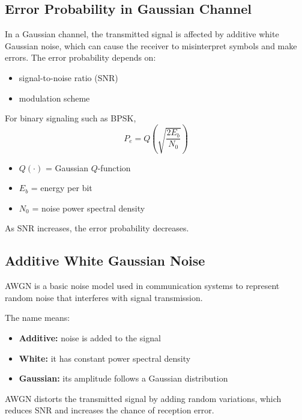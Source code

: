 \documentclass[11pt,a4paper]{book}
\newenvironment{definitionbox}[1][Definition]{%
    \begin{tcolorbox}[
        enhanced,
        breakable,
        colback=primaryblue!10,
        colframe=primaryblue!150,
        title=#1,
        fonttitle=\bfseries,
        sharp corners,
        boxrule=0.8pt,
        left=8pt,
        right=8pt,
        top=6pt,
        bottom=6pt
    ]
}{\end{tcolorbox}}
\newenvironment{formulabox}[1][Formula]{%
    \begin{tcolorbox}[
        enhanced,
        breakable,
        colback=softcoral!10,
        colframe=softcoral!200,
        title=#1,
        fonttitle=\bfseries,
        coltitle=white,
        sharp corners,
        boxrule=1pt,
        left=8pt,
        right=8pt,
        top=6pt,
        bottom=6pt
    ]
}{\end{tcolorbox}}
\begin{document}
\subsection{Error Probability in Gaussian Channel}

In a Gaussian channel, the transmitted signal is affected by additive white Gaussian noise, which can cause the receiver to misinterpret symbols and make errors. The error probability depends on:
\begin{itemize}
    \item signal-to-noise ratio (SNR)
    \item modulation scheme
\end{itemize}

\begin{formulabox}[Bit Error Probability for Binary Signaling]
For binary signaling such as BPSK,
\[
P_e=Q\!\left(\sqrt{\frac{2E_b}{N_0}}\right)
\]
\begin{itemize}
    \item \(Q(\cdot)\) = Gaussian \(Q\)-function
    \item \(E_b\) = energy per bit
    \item \(N_0\) = noise power spectral density
\end{itemize}
\end{formulabox}

As SNR increases, the error probability decreases.

\subsection{Additive White Gaussian Noise}

\begin{definitionbox}[Additive White Gaussian Noise]
AWGN is a basic noise model used in communication systems to represent random noise that interferes with signal transmission.
\end{definitionbox}

The name means:
\begin{itemize}
    \item \textbf{Additive:} noise is added to the signal
    \item \textbf{White:} it has constant power spectral density
    \item \textbf{Gaussian:} its amplitude follows a Gaussian distribution
\end{itemize}

AWGN distorts the transmitted signal by adding random variations, which reduces SNR and increases the chance of reception error.
\end{document}
